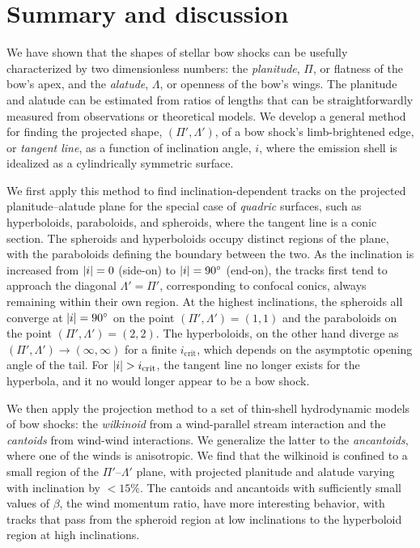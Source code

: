 \section{Summary and discussion}
\label{sec:conc}

We have shown that the shapes of stellar bow shocks can be usefully
characterized by two dimensionless numbers: the \textit{planitude},
\(\Pi\), or flatness of the bow's apex, and the \textit{alatude},
\(\Lambda\), or openness of the bow's wings.  The planitude and alatude can
be estimated from ratios of lengths that can be straightforwardly
measured from observations or theoretical models.  We develop a
general method for finding the projected shape,
\((\Pi', \Lambda')\), of a bow shock's limb-brightened edge, or
\textit{tangent line}, as a function of inclination angle, \(i\),
where the emission shell is idealized as a cylindrically symmetric
surface.

We first apply this method to find inclination-dependent tracks on the
projected planitude--alatude plane for the special case of
\textit{quadric} surfaces, such as hyperboloids, paraboloids, and
spheroids, where the tangent line is a conic section.  The spheroids
and hyperboloids occupy distinct regions of the plane, with the
paraboloids defining the boundary between the two.  As the inclination
is increased from \(\lvert i\rvert = 0\) (side-on) to \(\lvert i\rvert = \ang{90}\)
(end-on), the tracks first tend to approach the diagonal
\(\Lambda' = \Pi'\), corresponding to confocal conics, always remaining within
their own region.  At the highest inclinations, the spheroids all
converge at \(\lvert i\rvert = \ang{90}\) on the point
\((\Pi', \Lambda') = (1, 1)\) and the paraboloids on the point
\((\Pi', \Lambda') = (2, 2)\).  The hyperboloids, on the other hand diverge as
\((\Pi', \Lambda') \to (\infty, \infty)\) for a finite
\(i_{\mathrm{crit}}\), which depends on the asymptotic opening angle
of the tail.  For \(\lvert i\rvert > i_{\mathrm{crit}}\), the tangent line no
longer exists for the hyperbola, and it no would longer appear to be a
bow shock.

We then apply the projection method to a set of thin-shell
hydrodynamic models of bow shocks: the \textit{wilkinoid} from a
wind-parallel stream interaction and the \textit{cantoids} from
wind-wind interactions.  We generalize the latter to the
\textit{ancantoids}, where one of the winds is anisotropic.  We find
that the wilkinoid is confined to a small region of the
\(\Pi'\)--\(\Lambda'\) plane, with projected planitude and alatude varying with
inclination by \(< 15\%\).  The cantoids and ancantoids with
sufficiently small values of \(\beta\), the wind momentum ratio, have more
interesting behavior, with tracks that pass from the spheroid region
at low inclinations to the hyperboloid region at high inclinations.  

